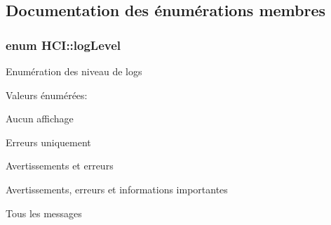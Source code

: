 \subsection{Documentation des énumérations membres}
\hypertarget{classHCI_a395f0ab7958108f23c34c7a04b56c4b0}{
\subsubsection[{log\-Level}]{\setlength{\rightskip}{0pt plus 5cm}enum {\bf H\-C\-I\-::log\-Level}}}\label{classHCI_a395f0ab7958108f23c34c7a04b56c4b0}
Enumération des niveau de logs \begin{Desc}
\item[Valeurs énumérées\-: ]\par
\begin{description}
\item[{\em 
\hypertarget{classHCI_a395f0ab7958108f23c34c7a04b56c4b0aa3b8d1d7f0361b9e659377b2aa6795b3}{N\-O\-T\-H\-I\-N\-G}\label{classHCI_a395f0ab7958108f23c34c7a04b56c4b0aa3b8d1d7f0361b9e659377b2aa6795b3}
}]Aucun affichage \item[{\em 
\hypertarget{classHCI_a395f0ab7958108f23c34c7a04b56c4b0acc4f9b9cc095c392851928025f83dbc6}{E\-R\-R\-O\-R}\label{classHCI_a395f0ab7958108f23c34c7a04b56c4b0acc4f9b9cc095c392851928025f83dbc6}
}]Erreurs uniquement \item[{\em 
\hypertarget{classHCI_a395f0ab7958108f23c34c7a04b56c4b0ac168191728df302afd8cb6564e8d1a6d}{W\-A\-R\-N\-I\-N\-G}\label{classHCI_a395f0ab7958108f23c34c7a04b56c4b0ac168191728df302afd8cb6564e8d1a6d}
}]Avertissements et erreurs \item[{\em 
\hypertarget{classHCI_a395f0ab7958108f23c34c7a04b56c4b0a1748594a322cb093ed9324ad91fe2f0f}{C\-R\-I\-T\-I\-N\-F\-O}\label{classHCI_a395f0ab7958108f23c34c7a04b56c4b0a1748594a322cb093ed9324ad91fe2f0f}
}]Avertissements, erreurs et informations importantes \item[{\em 
\hypertarget{classHCI_a395f0ab7958108f23c34c7a04b56c4b0ab3f339d63b08c4a353f0f6609366d6a2}{I\-N\-F\-O}\label{classHCI_a395f0ab7958108f23c34c7a04b56c4b0ab3f339d63b08c4a353f0f6609366d6a2}
}]Tous les messages \end{description}
\end{Desc}



